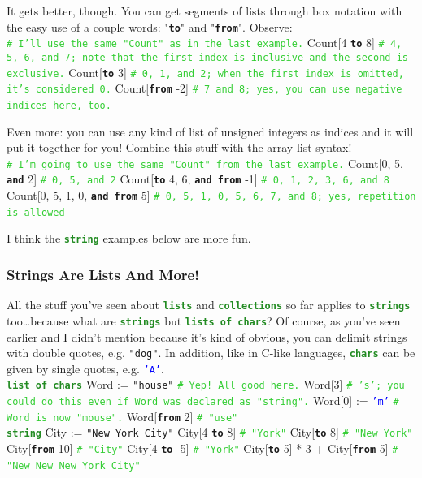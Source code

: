 \documentclass{article}
\newcommand{\sssecl}[1]{\subsubsection{#1}\label{sssec:#1}}
\newcommand{\codecomment}[1]{\texttt{\textcolor{LimeGreen}{#1}}}
\newcommand{\commentline}[1]{\codecomment{\# #1}}
\newcommand{\type}[1]{\texttt{\textcolor{ForestGreen}{\textbf{#1}}}}
\newcommand{\common}[1]{\texttt{\textcolor{Mulberry}{\textbf{#1}}}}
\newcommand{\codestring}[1]{\texttt{\textcolor{NavyBlue}{"#1"}}}
\newcommand{\codechar}[1]{\texttt{\textcolor{Blue}{#1}}}
\newenvironment{code}[0]
{\ttfamily{}				%
\setlength\parindent{0cm}	%
~\\}
{\setlength\parindent{1cm}
~\\}
\begin{document}
\indent It gets better, though. You can get segments of lists through box notation with the easy use of a couple words: "\common{to}" and "\common{from}". Observe:
\begin{code}
\commentline{I'll use the same "Count" as in the last example.}
Count[4 \common{to} 8] \commentline{4, 5, 6, and 7; note that the first index is inclusive and the second is exclusive.}
Count[\common{to} 3] \commentline{0, 1, and 2; when the first index is omitted, it's considered 0.}
Count[\common{from} -2] \commentline{7 and 8; yes, you can use negative indices here, too.}
\end{code}

\indent Even more: you can use any kind of list of unsigned integers as indices and it will put it together for you! Combine this stuff with the array list syntax!
\begin{code}
\commentline{I'm going to use the same "Count" from the last example.}
Count[0, 5, \common{and} 2] \commentline{0, 5, and 2}
Count[\common{to} 4, 6, \common{and from} -1] \commentline{0, 1, 2, 3, 6, and 8}
Count[0, 5, 1, 0, \common{and from} 5] \commentline{0, 5, 1, 0, 5, 6, 7, and 8; yes, repetition is allowed}
\end{code}

\indent I think the \type{string} examples below are more fun.

\sssecl{Strings Are Lists And More!}
\indent All the stuff you've seen about \type{lists} and \type{collections} so far applies to \type{strings} too\ldots because what are \type{strings} but \type{lists of chars}? Of course, as you've seen earlier and I didn't mention because it's kind of obvious, you can delimit strings with double quotes, e.g. \codestring{dog}. In addition, like in C-like languages, \type{chars} can be given by single quotes, e.g. \codechar{'A'}.
\begin{code}
\type{list of chars} Word := \codestring{house} \commentline{Yep! All good here.}
Word[3]	\commentline{'s'; you could do this even if Word was declared as "string".}
Word[0] := \codechar{'m'} \commentline{Word is now "mouse".}
Word[\common{from} 2] \commentline{"use"}\\

\type{string} City := \codestring{New York City}
City[4 \common{to} 8] \commentline{"York"}
City[\common{to} 8] \commentline{"New York"}
City[\common{from} 10] \commentline{"City"}
City[4 \common{to} -5] \commentline{"York"}
City[\common{to} 5] * 3 + City[\common{from} 5] \commentline{"New New New York City"}
\end{code}
\end{document}
